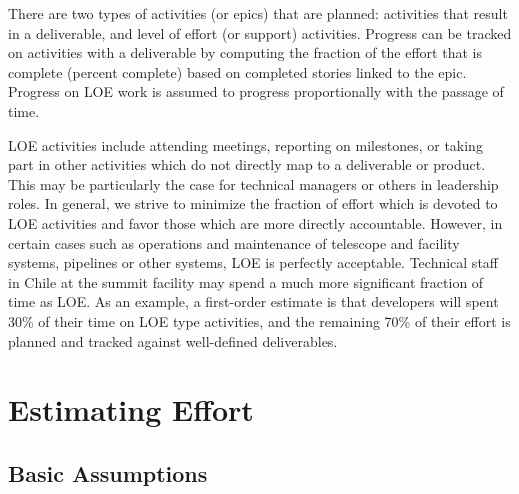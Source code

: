 There are two types of activities (or epics) that are planned:  activities that result in a deliverable, and level of effort (or support) activities.
Progress can be tracked on activities with a deliverable by computing the fraction of the effort that is complete (percent complete) based on completed stories linked to the epic.
Progress on \gls{LOE} work is assumed to progress proportionally with the passage of time.

\gls{LOE} activities include attending meetings, reporting on milestones, or taking part in other activities which do not directly map to a deliverable or product.
This may be particularly the case for technical managers or others in leadership roles.
In general, we strive to minimize the fraction of effort which is devoted to \gls{LOE} activities and favor those which are more directly accountable.
However, in certain cases such as operations and maintenance of telescope and facility systems, pipelines or other systems, \gls{LOE} is perfectly acceptable.
Technical staff in Chile at the summit facility may spend a much more significant fraction of time as \gls{LOE}.
As an example, a first-order estimate is that developers will spent 30\% of their time on \gls{LOE} type activities, and the remaining 70\% of their effort is planned and tracked against well-defined deliverables.


\section{Estimating Effort}
\label{sec:effort}

\subsection{Basic Assumptions}


